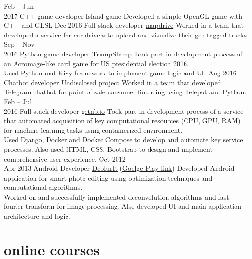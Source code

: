 \documentclass[]{friggeri-cv}
\begin{document}
\begin{entrylist}
	\entry
		{Feb -- Jun \\ 2017}
		{C++ game developer}
		{\href{https://bitbucket.org/standy66/studenttasks2017/src/cbc48cb2287b24df5fb5ed61c05ef77e5436ef01/task3/394Stepanov/}{Island game}}
		{Developed a simple OpenGL game with C++ and GLSL}
	\entry
		{Dec 2016}
		{Full-stack developer}
		{\href{https://github.com/GreenRiverRUS/map_drive}{mapdrive}}
		{Worked in a team that developed a service for car drivers to upload and visualize their geo-tagged tracks.}
	\entry
		{Sep -- Nov \\ 2016}
		{Python game developer}
		{\href{https://play.google.com/store/apps/details?id=org.trumpstamp.trumpstamp}{TrumpStamp}}
		{Took part in development process of an Acromage-like card game for US presidential election 2016. \\
		Used Python and Kivy framework to implement game logic and UI.}
	\entry
		{Aug 2016}
		{Chatbot developer}
		{Undisclosed project}
		{Worked in a team that developed Telegram chatbot for point of sale consumer financing using Telepot and Python.}
	\entry
		{Feb -- Jul \\ 2016}
		{Full-stack developer}
		{\href{https://gitlab.com/getnb/}{getnb.io}}
		{Took part in development process of a service that automated acquisition of key computational resources (CPU, GPU, RAM) for machine learning tasks using containerized environment. \\
		Used Django, Docker and Docker Compose to develop and automate key service processes. Also used HTML, CSS, Bootstrap to design and implement comprehensive user experience.}
	\entry
		{Oct 2012 -- \\ Apr 2013}
		{Android Developer}
		{\href{https://github.com/standy66/deblurit}{DeblurIt} (\href{https://play.google.com/store/apps/details?id=tk.standy66.deblurit}{Goolge Play link})}
		{Developed Android application for smart photo editing using optimization techniques and computational algorithms. \\
		Worked on and successfully implemented deconvolution algorithms and fast fourier transform for image processing. Also developed UI and main application architecture and logic.}
\end{entrylist}

\section{online courses}
\end{document}
